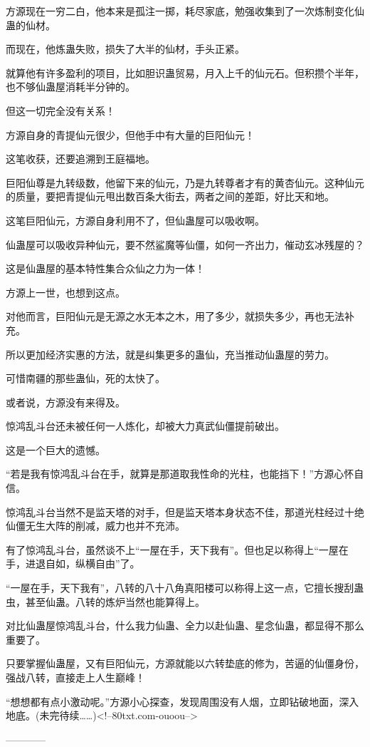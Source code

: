 \begin{this_body}
方源现在一穷二白，他本来是孤注一掷，耗尽家底，勉强收集到了一次炼制变化仙蛊的仙材。

而现在，他炼蛊失败，损失了大半的仙材，手头正紧。

就算他有许多盈利的项目，比如胆识蛊贸易，月入上千的仙元石。但积攒个半年，也不够仙蛊屋消耗半分钟的。

但这一切完全没有关系！

方源自身的青提仙元很少，但他手中有大量的巨阳仙元！

这笔收获，还要追溯到王庭福地。

巨阳仙尊是九转级数，他留下来的仙元，乃是九转尊者才有的黄杏仙元。这种仙元的质量，要把青提仙元甩出数百条大街去，两者之间的差距，好比天和地。

这笔巨阳仙元，方源自身利用不了，但仙蛊屋可以吸收啊。

仙蛊屋可以吸收异种仙元，要不然鲨魔等仙僵，如何一齐出力，催动玄冰残屋的？

这是仙蛊屋的基本特性集合众仙之力为一体！

方源上一世，也想到这点。

对他而言，巨阳仙元是无源之水无本之木，用了多少，就损失多少，再也无法补充。

所以更加经济实惠的方法，就是纠集更多的蛊仙，充当推动仙蛊屋的劳力。

可惜南疆的那些蛊仙，死的太快了。

或者说，方源没有来得及。

惊鸿乱斗台还未被任何一人炼化，却被大力真武仙僵提前破出。

这是一个巨大的遗憾。

“若是我有惊鸿乱斗台在手，就算是那道取我性命的光柱，也能挡下！”方源心怀自信。

惊鸿乱斗台当然不是监天塔的对手，但是监天塔本身状态不佳，那道光柱经过十绝仙僵无生大阵的削减，威力也并不充沛。

有了惊鸿乱斗台，虽然谈不上“一屋在手，天下我有”。但也足以称得上“一屋在手，进退自如，纵横自由”了。

“一屋在手，天下我有”，八转的八十八角真阳楼可以称得上这一点，它擅长搜刮蛊虫，甚至仙蛊。八转的炼炉当然也能算得上。

对比仙蛊屋惊鸿乱斗台，什么我力仙蛊、全力以赴仙蛊、星念仙蛊，都显得不那么重要了。

只要掌握仙蛊屋，又有巨阳仙元，方源就能以六转垫底的修为，苦逼的仙僵身份，强战八转，直接走上人生巅峰！

“想想都有点小激动呢。”方源小心探查，发现周围没有人烟，立即钻破地面，深入地底。(未完待续……)<!--80txt.com-ouoou-->

------------

\end{this_body}

